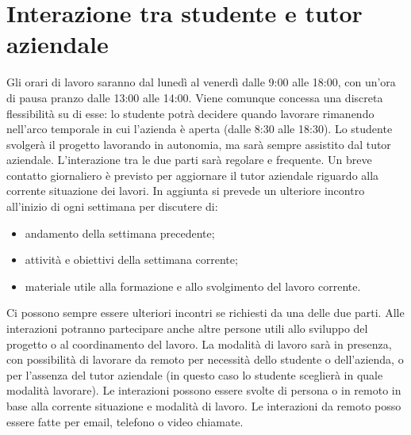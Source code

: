 \section*{Interazione tra studente e tutor aziendale}
Gli orari di lavoro saranno dal lunedì al venerdì dalle 9:00 alle 18:00, con un'ora di pausa pranzo dalle 13:00 alle 14:00. Viene comunque concessa una discreta flessibilità su di esse: lo studente potrà decidere quando lavorare rimanendo nell'arco temporale in cui l'azienda è aperta (dalle 8:30 alle 18:30). Lo studente svolgerà il progetto lavorando in autonomia, ma sarà sempre assistito dal tutor aziendale. L'interazione tra le due parti sarà regolare e frequente. Un breve contatto giornaliero è previsto per aggiornare il tutor aziendale riguardo alla corrente situazione dei lavori. In aggiunta si prevede un ulteriore incontro all'inizio di ogni settimana per discutere di:
\begin{itemize}
    \item andamento della settimana precedente;
    \item attività e obiettivi della settimana corrente;
    \item materiale utile alla formazione e allo svolgimento del lavoro corrente.
\end{itemize}
Ci possono sempre essere ulteriori incontri se richiesti da una delle due parti. 
Alle interazioni potranno partecipare anche altre persone utili allo sviluppo del progetto o al coordinamento del lavoro.
\newline
La modalità di lavoro sarà in presenza, con possibilità di lavorare da remoto per necessità dello studente o dell'azienda, o per l'assenza del tutor aziendale (in questo caso lo studente sceglierà in quale modalità lavorare). Le interazioni possono essere svolte di persona o in remoto in base alla corrente situazione e modalità di lavoro. Le interazioni da remoto posso essere fatte per email, telefono o video chiamate.